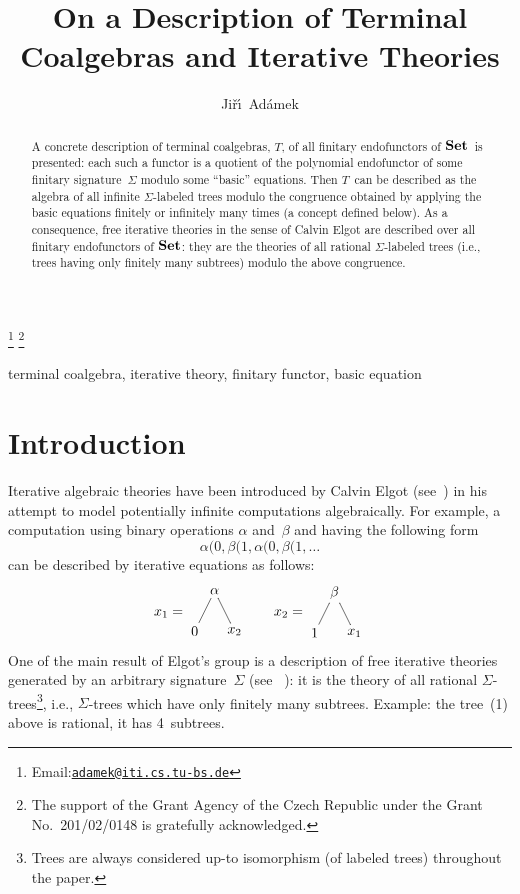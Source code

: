 \documentclass{entcs}
\newcommand{\Set}{\ensuremath{\St}}
\DeclareMathOperator{\St}{\textnormal{\textbf{Set}}}
\begin{document}
\begin{frontmatter}
\title{On a Description of Terminal Coalgebras and Iterative
Theories}
\author{Ji\v r\'\i\ Ad\'amek}
\address{Technical University of Braunschweig}
\thanks[mail]{Email:\href{mailto:adamek@iti.cs.tu-bs.de}
        {\texttt{\normalshape adamek@iti.cs.tu-bs.de}}}
\thanks[CZ]{The support of the Grant Agency of the Czech
            Republic under the Grant No.~201/02/0148
            is gratefully acknowledged.}
\begin{keyword}
terminal coalgebra, iterative theory, finitary functor, basic equation
\end{keyword}
\begin{abstract}
A concrete description of terminal coalgebras, $T$, of all finitary
endofunctors of \Set\ is presented: each such a functor is a quotient of
the polynomial endofunctor of some finitary signature~$\Sigma$
modulo some ``basic'' equations. Then $T$~can be described as the
algebra of all infinite $\Sigma$-labeled trees modulo the congruence
obtained by applying the basic equations finitely or infinitely
many times (a concept defined below). As a consequence, free
iterative theories in the sense of Calvin Elgot are described over
all finitary endofunctors of \Set: they are the theories of all
rational $\Sigma$-labeled trees (i.e., trees having only finitely
many subtrees) modulo the above congruence.
\end{abstract}
\end{frontmatter}


\section{Introduction}
Iterative algebraic theories have been introduced by Calvin Elgot
(see~\cite{e}) in his attempt to model potentially infinite
computations algebraically. For example, a computation using binary
operations $\alpha$ and~$\beta$ and having the following form
\begin{equation}
\alpha(0, \beta(1,\alpha(0, \beta(1,\dots
\end{equation}
can be described by iterative equations as follows:
\begin{equation}
x_1=
\vcenter{
\xy
\POS (05,10)*+{\alpha} = "t"
   , (00,00)*+{0}      = "l"
   , (10,00)*+{x_2}    = "r"
\POS "l" \ar@{-} "t"
\POS "r" \ar@{-} "t"
\endxy
}
\quad
\quad
x_2=
\vcenter{
\xy
\POS (05,10)*+{\beta}  = "t"
   , (00,00)*+{1}      = "l"
   , (10,00)*+{x_1}    = "r"
\POS "l" \ar@{-} "t"
\POS "r" \ar@{-} "t"
\endxy
}
\end{equation}
One of the main result of Elgot's group is a description of free
iterative theories generated by an arbitrary signature~$\Sigma$ (see
~\cite{ebt}): it is the theory of all rational
$\Sigma$-trees\footnote{Trees are always considered up-to
isomorphism (of labeled trees) throughout the paper.}, i.e.,
$\Sigma$-trees which have only finitely many subtrees. Example: the
tree~(1) above is rational, it has 4~subtrees.
\end{document}
